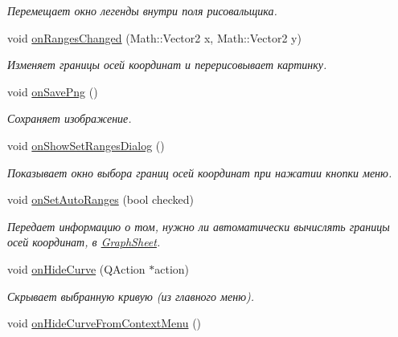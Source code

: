 \begin{DoxyCompactItemize}
\begin{DoxyCompactList}\small\item\em Перемещает окно легенды внутри поля рисовальщика. \end{DoxyCompactList}\item 
void \hyperlink{class_graph_window_a76559e3f41e482a43f715f519df4487c}{on\+Ranges\+Changed} (Math\+::\+Vector2 x, Math\+::\+Vector2 y)
\begin{DoxyCompactList}\small\item\em Изменяет границы осей координат и перерисовывает картинку. \end{DoxyCompactList}\item 
void \hyperlink{class_graph_window_a51f89adcbef5b90b9fdbb24bf7536fe5}{on\+Save\+Png} ()
\begin{DoxyCompactList}\small\item\em Сохраняет изображение. \end{DoxyCompactList}\item 
void \hyperlink{class_graph_window_aca7c92575aaed2db319bb86a1e1e36e9}{on\+Show\+Set\+Ranges\+Dialog} ()\hypertarget{class_graph_window_aca7c92575aaed2db319bb86a1e1e36e9}{}\label{class_graph_window_aca7c92575aaed2db319bb86a1e1e36e9}

\begin{DoxyCompactList}\small\item\em Показывает окно выбора границ осей координат при нажатии кнопки меню. \end{DoxyCompactList}\item 
void \hyperlink{class_graph_window_ac6e6c5f747d9fc8d4f1988262cf12303}{on\+Set\+Auto\+Ranges} (bool checked)\hypertarget{class_graph_window_ac6e6c5f747d9fc8d4f1988262cf12303}{}\label{class_graph_window_ac6e6c5f747d9fc8d4f1988262cf12303}

\begin{DoxyCompactList}\small\item\em Передает информацию о том, нужно ли автоматически вычислять границы осей координат, в \hyperlink{class_graph_sheet}{Graph\+Sheet}. \end{DoxyCompactList}\item 
void \hyperlink{class_graph_window_aa5e82d18c3767b11b36b1b76cf989054}{on\+Hide\+Curve} (Q\+Action $\ast$action)\hypertarget{class_graph_window_aa5e82d18c3767b11b36b1b76cf989054}{}\label{class_graph_window_aa5e82d18c3767b11b36b1b76cf989054}

\begin{DoxyCompactList}\small\item\em Скрывает выбранную кривую (из главного меню). \end{DoxyCompactList}\item 
void \hyperlink{class_graph_window_a81681956de7261ef2fa6b6ed28e2e903}{on\+Hide\+Curve\+From\+Context\+Menu} ()\hypertarget{class_graph_window_a81681956de7261ef2fa6b6ed28e2e903}{}\label{class_graph_window_a81681956de7261ef2fa6b6ed28e2e903}


\end{DoxyCompactItemize}
